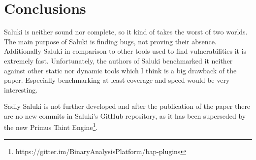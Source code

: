 \documentclass[a4paper, 12pt, journal, onecolumn]{IEEEtran}
\begin{document}
\section{Conclusions}

Saluki is neither sound nor complete, so it kind of takes the worst of two worlds. The main purpose of Saluki is finding bugs, not proving their absence. Additionally Saluki in comparison to other tools used to find vulnerabilities it is extremely fast. Unfortunately, the authors of Saluki benchmarked it neither against other static nor dynamic tools which I think is a big drawback of the paper. Especially benchmarking at least coverage and speed would be very interesting.  


Sadly Saluki is not further developed and after the publication of the paper \cite{saluki} there are no new commits in Saluki's GitHub repository, as it has been superseded by the new Primus Taint Engine\footnote{https://gitter.im/BinaryAnalysisPlatform/bap-plugins}. 

\newpage



\end{document}
